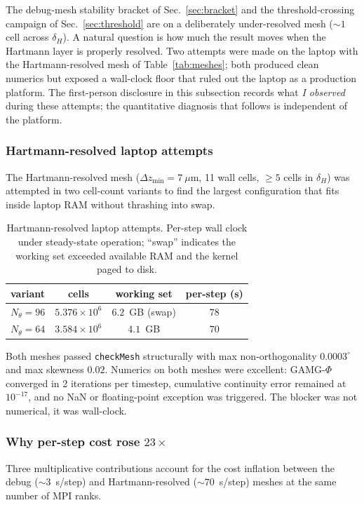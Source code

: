 \documentclass[aps,prl,twocolumn,superscriptaddress]{revtex4-2}
\begin{document}
The debug-mesh stability bracket of Sec.~\ref{sec:bracket} and the
threshold-crossing campaign of Sec.~\ref{sec:threshold} are on a
deliberately under-resolved mesh ($\sim\!1$ cell across $\delta_H$).
A natural question is how much the result moves when the Hartmann
layer is properly resolved.  Two attempts were made on the laptop
with the Hartmann-resolved mesh of Table~\ref{tab:meshes}; both
produced clean numerics but exposed a wall-clock floor that ruled
out the laptop as a production platform.  The first-person
disclosure in this subsection records what \emph{I observed} during
these attempts; the quantitative diagnosis that follows is
independent of the platform.

\subsubsection*{Hartmann-resolved laptop attempts}
The Hartmann-resolved mesh ($\Delta z_{\min} = 7~\mu$m, 11 wall cells,
$\ge 5$ cells in $\delta_H$) was attempted in two cell-count variants
to find the largest configuration that fits inside laptop RAM
without thrashing into swap.

\begin{table}[h!]
\centering
\caption{Hartmann-resolved laptop attempts.  Per-step wall clock
under steady-state operation; ``swap'' indicates the working set
exceeded available RAM and the kernel paged to disk.}
\label{tab:hartmann_attempts}
\begin{tabular}{|l|c|c|c|}\hline
variant & cells & working set & per-step (s) \\ \hline
$N_\theta = 96$ & $5.376\!\times\!10^{6}$ & $6.2$~GB (swap) & $78$ \\
$N_\theta = 64$ & $3.584\!\times\!10^{6}$ & $4.1$~GB & $70$ \\
\hline
\end{tabular}
\end{table}

Both meshes passed \texttt{checkMesh} structurally with max
non-orthogonality $0.0003^{\circ}$ and max skewness $0.02$.  Numerics
on both meshes were excellent: GAMG-$\Phi$ converged in 2 iterations
per timestep, cumulative continuity error remained at $10^{-17}$, and
no NaN or floating-point exception was triggered.  The blocker was
not numerical, it was wall-clock.

\subsubsection*{Why per-step cost rose $23\!\times$}
Three multiplicative contributions account for the cost inflation
between the debug ($\sim\!3$~s/step) and Hartmann-resolved
($\sim\!70$~s/step) meshes at the same number of MPI ranks.
\end{document}
